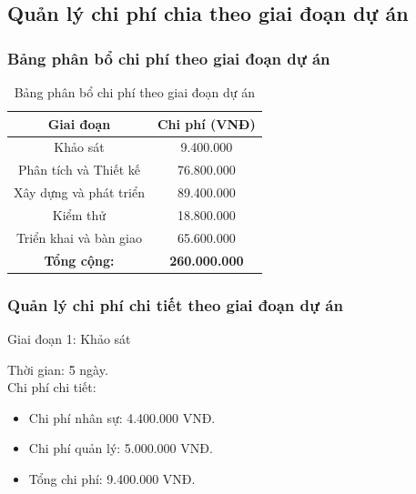 \subsection{Quản lý chi phí chia theo giai đoạn dự án}
\subsubsection{Bảng phân bổ chi phí theo giai đoạn dự án}
\begin{table}[H]
    \centering
    \renewcommand{\arraystretch}{1.5} %
    \caption{Bảng phân bổ chi phí theo giai đoạn dự án}
    \begin{tabular}{|c|c|}
        \hline
        \textbf{Giai đoạn}                        & \textbf{Chi phí (VNĐ)} \\
        \hline
        Khảo sát                                  & 9.400.000              \\
        \hline
        Phân tích và Thiết kế                     & 76.800.000             \\
        \hline
        Xây dựng và phát triển                    & 89.400.000             \\
        \hline
        Kiểm thử                                  & 18.800.000             \\
        \hline
        Triển khai và bàn giao                    & 65.600.000             \\
        \hline
        \multicolumn{1}{|c|}{\textbf{Tổng cộng:}} & \textbf{260.000.000}   \\
        \hline
    \end{tabular}
\end{table}


\subsubsection{Quản lý chi phí chi tiết theo giai đoạn dự án}
Giai đoạn 1: Khảo sát
\begin{tabbing}
    Thời gian: \= 5 ngày. \\
    Chi phí chi tiết: %
\end{tabbing}
\begin{itemize}
    \item Chi phí nhân sự: 4.400.000 VNĐ.
    \item Chi phí quản lý: 5.000.000 VNĐ.
    \item Tổng chi phí: 9.400.000 VNĐ.
\end{itemize}

